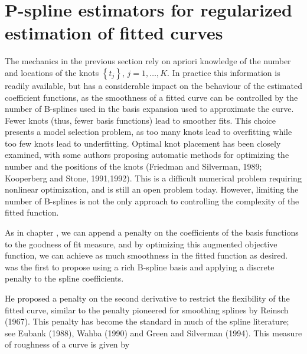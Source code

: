 \documentclass[12pt]{article}
\newcommand*\needsparaphrased{\color{red}}
\theoremstyle{definition}
\begin{document}





\section{P-spline estimators for regularized estimation of fitted curves}

The mechanics in the previous section rely on apriori knowledge of the number and locations of the knots $\left\{t_j\right\}$, $j=1,\dots,K$. In practice this information is readily available, but has a considerable impact on the behaviour of the estimated coefficient functions, as the smoothness of a fitted curve can be controlled by the number of B-splines used in the basis expansion used to approximate the curve. Fewer knots (thus, fewer basis functions) lead to smoother fits. This choice presents a model selection problem, as too many knots lead to overfitting while too few knots lead to underfitting. Optimal knot placement has been closely examined, with some authors proposing automatic methods for optimizing the number and the positions of the knots (Friedman and Silverman, 1989; Kooperberg and Stone, 1991,1992). This is a difficult numerical problem requiring nonlinear optimization, and is still an open problem today. However, limiting the number of B-splines is not the only approach to controlling the complexity of the fitted function. 

As in chapter {\needsparaphrased{smoothing spline chapter}}, we can append a penalty on the coefficients of the basis functions to the goodness of fit measure, and by optimizing this augmented objective function, we can achieve as much smoothness in the fitted function as desired. \cite{o1986statistical} was the first to propose using a rich B-spline basis and applying a discrete penalty to the spline coefficients. 

 He proposed a penalty on the second derivative to restrict the flexibility of the fitted curve, similar to the penalty pioneered for smoothing splines by Reinsch (1967). This penalty has become the standard in much of the spline literature; see Eubank (1988), Wahba (1990) and Green and Silverman (1994). This measure of roughness of a curve is given by 
 
\end{document}
